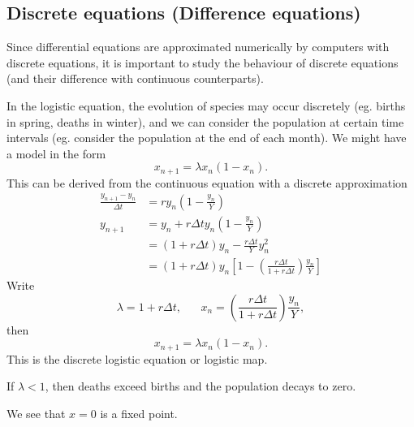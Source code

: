 \documentclass[a4paper]{article}
\begin{document}
\subsection{Discrete equations (Difference equations)}
Since differential equations are approximated numerically by computers with discrete equations, it is important to study the behaviour of discrete equations (and their difference with continuous counterparts).

In the logistic equation, the evolution of species may occur discretely (eg. births in spring, deaths in winter), and we can consider the population at certain time intervals (eg. consider the population at the end of each month). We might have a model in the form
\[
  x_{n + 1} = \lambda x_n(1 - x_n).
\]
This can be derived from the continuous equation with a discrete approximation
\begin{align*}
  \frac{y_{n+1} - y_n}{\Delta t} &= ry_n\left(1 - \frac{y_n}{Y}\right)\\
  y_{n + 1} &= y_n + r\Delta ty_n\left(1 - \frac{y_n}{Y}\right)\\
  &= (1 + r\Delta t)y_n - \frac{r\Delta t}{Y}y_n^2\\
  &= (1 + r\Delta t)y_n\left[1 - \left(\frac{r\Delta t}{1 + r\Delta t}\right)\frac{y_n}{Y}\right]
\end{align*}
Write
\[
  \lambda = 1 + r\Delta t,\;\;\;\;\;\; x_n = \left(\frac{r\Delta t}{1 + r\Delta t}\right)\frac{y_n}{Y},
\]
then
\[
  x_{n+1}=\lambda x_n(1 - x_n).
\]
This is the discrete logistic equation or logistic map.

If $\lambda < 1$, then deaths exceed births and the population decays to zero.
\begin{center}
\end{center}
We see that $x = 0$ is a fixed point.
\end{document}
